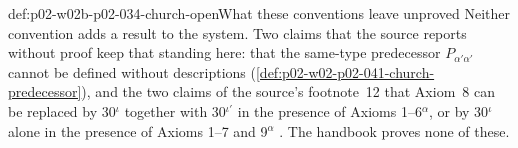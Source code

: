\begin{hbwarning}{def:p02-w02b-p02-034-church-open}{What these conventions leave unproved}
Neither convention adds a result to the system.  Two claims that the source
reports without proof keep that standing here: that the same-type
predecessor \(P_{\alpha'\alpha'}\) cannot be defined without descriptions
(\cref{def:p02-w02-p02-041-church-predecessor}), and the two claims of the
source's footnote~12 that Axiom~8 can be replaced by 30\(^\iota\) together
with 30\(^{\iota'}\) in the presence of Axioms 1--6\(^\alpha\), or by
30\(^\iota\) alone in the presence of Axioms 1--7 and 9\(^\alpha\)
\cite[\S6, p.~66, n.~12]{Church1940}.  The handbook proves none of these.
\end{hbwarning}
